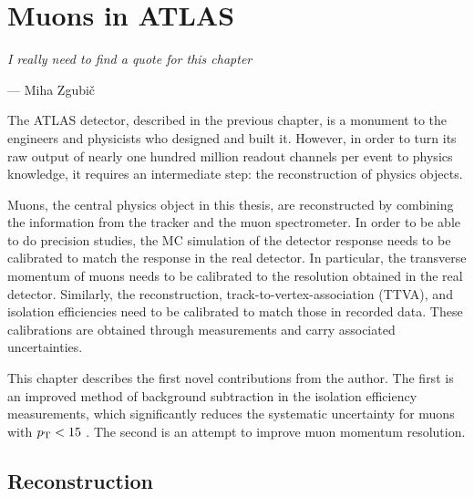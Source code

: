 \chapter{Muons in ATLAS}
\label{sec:muons}
  
\textit{I really need to find a quote for this chapter}
\vspace{5mm}
\begin{flushright}
--- Miha Zgubi\v{c}
\end{flushright}

\thispagestyle{empty}
\newpage
The ATLAS detector, described in the previous chapter, is a monument
to the engineers and physicists who designed and built it. However,
in order to turn its raw output of nearly one hundred million readout
channels per event to physics knowledge, it requires an intermediate step:
the reconstruction of physics objects.

Muons, the central physics object in this thesis, are reconstructed
by combining the information from the tracker and the muon spectrometer.
In order to be able to do precision studies, the MC
simulation of the detector response needs to be calibrated to match
the response in the real detector. In particular, the transverse momentum of
muons needs to be calibrated to the resolution obtained in the real
detector. Similarly, the reconstruction, track-to-vertex-association (TTVA),
and isolation efficiencies need to be calibrated to match those in 
recorded data. These calibrations are obtained through measurements
and carry associated uncertainties.

This chapter describes the first novel contributions from the author.
The first is an improved method of background subtraction in the isolation
efficiency measurements, which significantly reduces the systematic
uncertainty for muons with $p_{\text{T}} < 15$ \GeV. The second is an attempt
to improve muon momentum resolution.

\section{Reconstruction}

